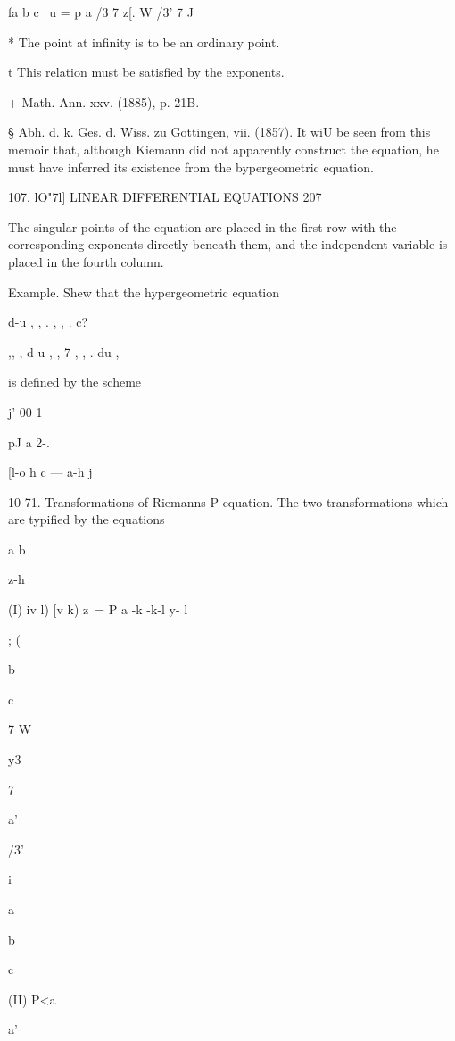 fa b c \ 
u = p a /3 7 z[. 
W /3' 7 J 

* The point at infinity is to be an ordinary point. 

t This relation must be satisfied by the exponents. 

+ Math. Ann. xxv. (1885), p. 21B. 

§ Abh. d. k. Ges. d. Wiss. zu Gottingen, vii. (1857). It wiU be seen from this memoir that, 
although Kiemann did not apparently construct the equation, he must have inferred its existence 
from the bypergeometric equation. 



107, lO"7l] LINEAR DIFFERENTIAL EQUATIONS 207 

The singular points of the equation are placed in the first row with the 
corresponding exponents directly beneath them, and the independent variable 
is placed in the fourth column. 



Example. Shew that the hypergeometric equation 

d-u , , . , , . c? 



,, , d-u , , 7 , , . du , 



is defined by the scheme 

j' 00 1 \ 

pJ a 2-. 

[l-o h c — a-h j 

10 71. Transformations of Riemanns P-equation. 
The two transformations which are typified by the equations 

a b 



z-h 



(I) iv l) [v k)      z\ = P a -k  -k-l y- l 



; (  


b 


c 


7  W 


y3 


7 


a' 


/3' 


i 


a 


b 


c 


(II) P<a 

a' 


